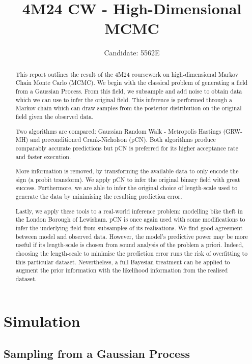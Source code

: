 \documentclass[]{article}
\title{4M24 CW - High-Dimensional MCMC}
\author{Candidate: 5562E}
\begin{document}


\setcounter{page}{1}
\maketitle

\begin{abstract}
	This report outlines the result of the 4M24 coursework on high-dimensional Markov Chain Monte Carlo (MCMC). We begin with the classical problem of generating a field from a Gaussian Process. From this field, we subsample and add noise to obtain data which we can use to infer the original field. This inference is performed through a Markov chain which can draw samples from the posterior distribution on the original field given the observed data.
	
	Two algorithms are compared: Gaussian Random Walk - Metropolis Hastings (GRW-MH) and preconditioned Crank-Nicholson (pCN). Both algorithms produce comparably accurate predictions but pCN is preferred for its higher acceptance rate and faster execution.
	
	More information is removed, by transforming the available data to only encode the sign (a probit transform). We apply pCN to infer the original binary field with great success. Furthermore, we are able to infer the original choice of length-scale used to generate the data by minimising the resulting prediction error.
	
	Lastly, we apply these tools to a real-world inference problem: modelling bike theft in the London Borough of Lewisham. pCN is once again used with some modifications to infer the underlying field from subsamples of its realisations. We find good agreement between model and observed data. However, the model's predictive power may be more useful if its length-scale is chosen from sound analysis of the problem a priori. Indeed, choosing the length-scale to minimise the prediction error runs the risk of overfitting to this particular dataset. Nevertheless, a full Bayesian treatment can be applied to augment the prior information with the likelihood information from the realised dataset. 
\end{abstract}

\section{Simulation}
\subsection{Sampling from a Gaussian Process}
\end{document}

